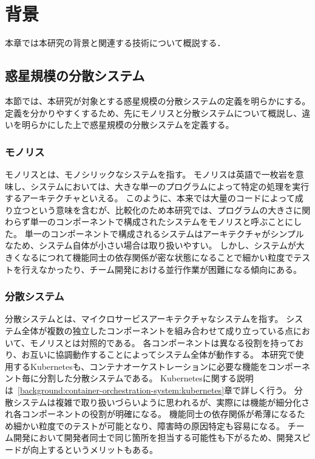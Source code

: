 \chapter{背景}
\label{background}

本章では本研究の背景と関連する技術について概説する．

\section{惑星規模の分散システム}
\label{bg:definition}

本節では、本研究が対象とする惑星規模の分散システムの定義を明らかにする。
定義を分かりやすくするため、先にモノリスと分散システムについて概説し、違いを明らかにした上で惑星規模の分散システムを定義する。

\subsection{モノリス}
\label{bg:definition:monolith}

モノリスとは、モノシリックなシステムを指す。
モノリスは英語で一枚岩を意味し、システムにおいては、大きな単一のプログラムによって特定の処理を実行するアーキテクチャといえる。
このように、本来では大量のコードによって成り立つという意味を含むが、比較化のため本研究では、プログラムの大きさに関わらず単一のコンポーネントで構成されたシステムをモノリスと呼ぶことにした。
単一のコンポーネントで構成されるシステムはアーキテクチャがシンプルなため、システム自体が小さい場合は取り扱いやすい。
しかし、システムが大きくなるにつれて機能同士の依存関係が密な状態になることで細かい粒度でテストを行えなかったり、チーム開発における並行作業が困難になる傾向にある。

\subsection{分散システム}
\label{bg:definition:distributed-system}

分散システムとは、マイクロサービスアーキテクチャなシステムを指す。
システム全体が複数の独立したコンポーネントを組み合わせて成り立っている点において、モノリスとは対照的である。
各コンポーネントは異なる役割を持っており、お互いに協調動作することによってシステム全体が動作する。
本研究で使用するKubernetesも、コンテナオーケストレーションに必要な機能をコンポーネント毎に分割した分散システムである。
Kubernetesに関する説明は~\ref{background:container-orchestration-system:kubernetes}章で詳しく行う。
分散システムは複雑で取り扱いづらいように思われるが、実際には機能が細分化され各コンポーネントの役割が明確になる。
機能同士の依存関係が希薄になるため細かい粒度でのテストが可能となり、障害時の原因特定も容易になる。
チーム開発において開発者同士で同じ箇所を担当する可能性も下がるため、開発スピードが向上するというメリットもある。

